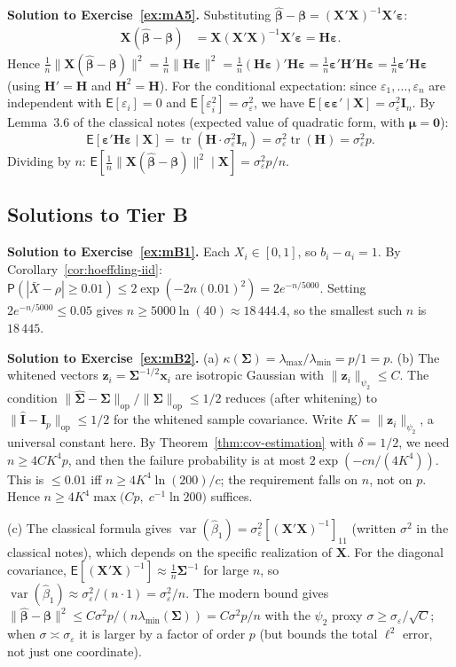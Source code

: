 \documentclass[14pt]{extarticle}
\theoremstyle{plain}
\theoremstyle{definition}
\theoremstyle{remark}
\newcommand\expc{\mathsf{E}}
\newcommand\prb{\mathsf{P}}
\DeclareMathOperator\var{var}
\DeclareMathOperator\tr{tr}
\newcommand{\bX}{\mathbf{X}}
\newcommand{\bx}{\mathbf{x}}
\def\bb{\boldsymbol{\beta}}
\newcommand{\be}{\boldsymbol{\varepsilon}}
\newcommand{\bI}{\mathbf{I}}
\newcommand{\bH}{\mathbf{H}}
\newcommand{\bzero}{\mathbf{0}}
\newcommand{\bz}{\mathbf{z}}
\newcommand{\bSigma}{\boldsymbol{\Sigma}}
\newcommand{\hbSigma}{\hat{\boldsymbol{\Sigma}}}
\newcommand{\hbb}{\hat{\boldsymbol{\beta}}}
\newcommand{\opnorm}[1]{\|#1\|_{\mathrm{op}}}
\begin{document}
\textbf{Solution to Exercise~\ref{ex:mA5}.} Substituting $\hbb - \bb = (\bX'\bX)^{-1}\bX'\be$:
\begin{align*}
\bX(\hbb - \bb) &= \bX(\bX'\bX)^{-1}\bX'\be = \bH\be.
\end{align*}
Hence $\frac{1}{n}\|\bX(\hbb-\bb)\|^2 = \frac{1}{n}\|\bH\be\|^2 = \frac{1}{n}(\bH\be)'\bH\be = \frac{1}{n}\be'\bH'\bH\be = \frac{1}{n}\be'\bH\be$ (using $\bH' = \bH$ and $\bH^2 = \bH$). For the conditional expectation: since $\varepsilon_1, \ldots, \varepsilon_n$ are independent with $\expc[\varepsilon_i] = 0$ and $\expc[\varepsilon_i^2] = \sigma_\varepsilon^2$, we have $\expc[\be\be' \mid \bX] = \sigma_\varepsilon^2\bI_n$. By Lemma~3.6 of the classical notes (expected value of quadratic form, with $\boldsymbol\mu = \bzero$):
\[
\expc[\be'\bH\be \mid \bX] = \tr(\bH\cdot\sigma_\varepsilon^2\bI_n) = \sigma_\varepsilon^2\tr(\bH) = \sigma_\varepsilon^2 p.
\]
Dividing by $n$: $\expc[\frac{1}{n}\|\bX(\hbb-\bb)\|^2 \mid \bX] = \sigma_\varepsilon^2 p/n$.

\subsection*{Solutions to Tier B}

\textbf{Solution to Exercise~\ref{ex:mB1}.} Each $X_i \in [0, 1]$, so $b_i - a_i = 1$. By Corollary~\ref{cor:hoeffding-iid}: $\prb(|\bar{X} - \rho| \geqslant 0.01) \leqslant 2\exp(-2n(0.01)^2) = 2e^{-n/5000}$. Setting $2e^{-n/5000} \leqslant 0.05$ gives $n \geqslant 5000\ln(40) \approx 18\,444.4$, so the smallest such $n$ is $18\,445$.

\textbf{Solution to Exercise~\ref{ex:mB2}.} (a) $\kappa(\bSigma) = \lambda_{\max}/\lambda_{\min} = p/1 = p$. (b) The whitened vectors $\bz_i = \bSigma^{-1/2}\bx_i$ are isotropic Gaussian with $\|\bz_i\|_{\psi_2} \leqslant C$. The condition $\opnorm{\hbSigma - \bSigma}/\opnorm{\bSigma} \leqslant 1/2$ reduces (after whitening) to $\opnorm{\hat{\mathbf{I}} - \bI_p} \leqslant 1/2$ for the whitened sample covariance. Write $K = \|\bz_i\|_{\psi_2}$, a universal constant here. By Theorem~\ref{thm:cov-estimation} with $\delta = 1/2$, we need $n \geqslant 4CK^4p$, and then the failure probability is at most $2\exp(-cn/(4K^4))$. This is $\leqslant 0.01$ iff $n \geqslant 4K^4\ln(200)/c$; the requirement falls on $n$, not on $p$. Hence $n \geqslant 4K^4\max\!\big(Cp,\; c^{-1}\ln 200\big)$ suffices.

(c) The classical formula gives $\var(\hat\beta_1) = \sigma_\varepsilon^2[(\bX'\bX)^{-1}]_{11}$ (written $\sigma^2$ in the classical notes), which depends on the specific realization of $\bX$. For the diagonal covariance, $\expc[(\bX'\bX)^{-1}] \approx \frac{1}{n}\bSigma^{-1}$ for large $n$, so $\var(\hat\beta_1) \approx \sigma_\varepsilon^2/(n\cdot 1) = \sigma_\varepsilon^2/n$. The modern bound gives $\|\hbb - \bb\|^2 \leqslant C\sigma^2 p/(n\lambda_{\min}(\bSigma)) = C\sigma^2 p/n$ with the $\psi_2$ proxy $\sigma \geqslant \sigma_\varepsilon/\sqrt{C}$; when $\sigma \asymp \sigma_\varepsilon$ it is larger by a factor of order $p$ (but bounds the total $\ell^2$ error, not just one coordinate).
\end{document}
